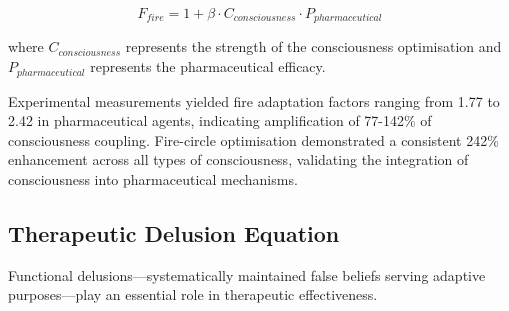 \documentclass{article}
\theoremstyle{definition}
\theoremstyle{remark}
\begin{document}
\begin{equation}
F_{fire} = 1 + \beta \cdot C_{consciousness} \cdot P_{pharmaceutical}
\label{eq:fire_factor}
\end{equation}

where $C_{consciousness}$ represents the strength of the consciousness optimisation and $P_{pharmaceutical}$ represents the pharmaceutical efficacy.

Experimental measurements yielded fire adaptation factors ranging from 1.77 to 2.42 in pharmaceutical agents, indicating amplification of 77-142\% of consciousness coupling. Fire-circle optimisation demonstrated a consistent 242\% enhancement across all types of consciousness, validating the integration of consciousness into pharmaceutical mechanisms.

\subsection{Therapeutic Delusion Equation}

Functional delusions—systematically maintained false beliefs serving adaptive purposes—play an essential role in therapeutic effectiveness.
\end{document}
